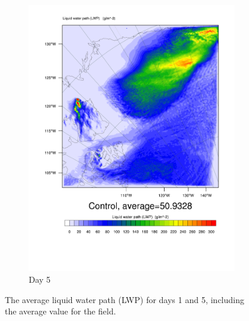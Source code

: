 \begin{figure}
\begin{subfigure}{0.48\textwidth}
        \includegraphics[width=\textwidth]{results/control/LWP_Day5.pdf}
        \caption{Day 5}
        \label{subfig:LWPr1Day5}
    \end{subfigure}
    \caption{The average liquid water path (LWP) for days 1 and 5, including the average value for the field.}
    \label{fig:LWP}
\end{figure}

